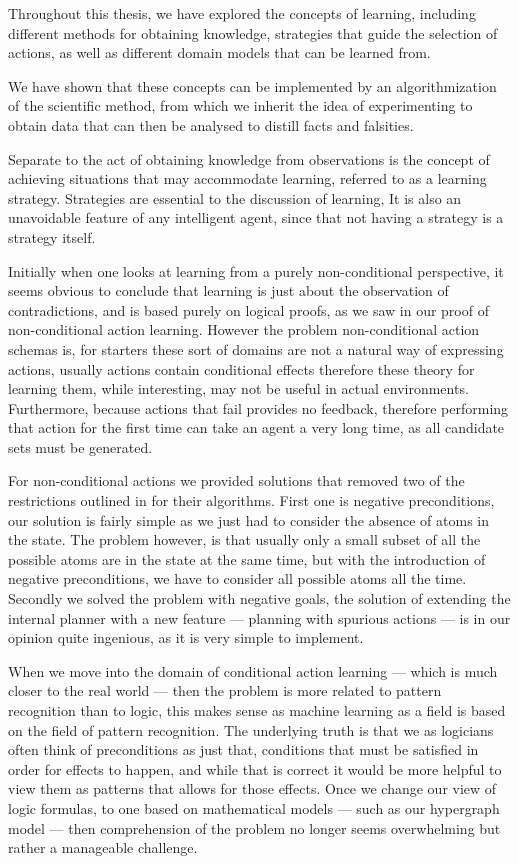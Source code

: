 \documentclass[Master.tex]{subfiles}
\begin{document}
Throughout this thesis, we have explored the concepts of learning, including different methods for obtaining knowledge, strategies that guide the selection of actions, as well as different domain models that can be learned from.

We have shown that these concepts can be implemented by an algorithmization of the scientific method, from which we inherit the idea of experimenting to obtain data that can then be analysed to distill facts and falsities.

	Separate to the act of obtaining knowledge from observations is the concept of achieving situations that may accommodate learning, referred to as a learning strategy.
	Strategies are essential to the discussion of learning, 
	It is also an unavoidable feature of any intelligent agent, since that not having a strategy is a strategy itself. 


	Initially when one looks at learning from a purely non-conditional perspective, 
	it seems obvious to conclude that learning is just about the observation of contradictions,
	and is based purely on logical proofs, as we saw in our proof of non-conditional action learning.
	However the problem non-conditional action schemas is, for starters 
	these sort of domains are not a natural way of expressing actions, 
	usually actions contain conditional effects therefore these theory for learning them, 
	while interesting, may not be useful in actual environments.
	Furthermore, because actions that fail provides no feedback, 
	therefore performing that action for the first time can take an agent a very long time, as all candidate sets must be generated.
	
	For non-conditional actions we provided solutions that removed two of the restrictions outlined in \cite{Walsh2008} for their algorithms.
	First one is negative preconditions, our solution is fairly simple as we just had to consider the absence of atoms in the state.
	The problem however, is that usually only a small subset of all the possible atoms are in the state at the same time, 
	but with the introduction of negative preconditions, we have to consider all possible atoms all the time.
	Secondly we solved the problem with negative goals, the solution of extending the internal planner with a new feature --- planning with spurious actions --- is in our opinion quite ingenious, as it is very simple to implement. 
	
	
	When we move into the domain of conditional action learning --- which is much closer to the real world --- 
	then the problem is more related to pattern recognition than to logic, this makes sense as machine learning as a field is based on the field of pattern recognition. 
	The underlying truth is that we as logicians often think of preconditions as just that, conditions that must be satisfied in order for effects to happen, and while that is correct it would be more helpful to view them as patterns that allows for those effects.
	Once we change our view of logic formulas, to one based on mathematical models --- such as our hypergraph model ---	then comprehension of the problem no longer seems overwhelming but rather a manageable challenge. 
	
\end{document}
